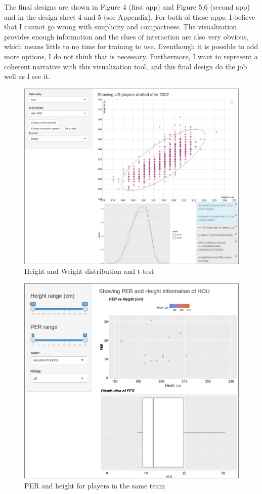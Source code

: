 \documentclass[a4paper,12pt,twoside]{article}
\numberwithin{equation}{section}
\begin{document}
The final designs are shown in Figure 4 (first app) and Figure 5,6 (second app) and in the design sheet 4 and 5 (see Appendix). For both of these apps, I believe that I cannot go wrong with simplicity and compactness. The visualization provides enough information and the clues of interaction are also very obvious, which means little to no time for training to use. Eventhough it is possible to add more options, I do not think that is necessary. Furthermore, I want to represent a coherent narrative with this visualization tool, and this final design do the job well as I see it.
\begin{figure}[h]
\caption{Height and Weight distribution and t-test}
\includegraphics[scale=0.35]{op1.jpg}
\centering
\end{figure}
\begin{figure}[h]
\caption{PER and height for players in the same team}
\includegraphics[scale=0.35]{op2.jpg}
\centering
\end{figure}
\end{document}
